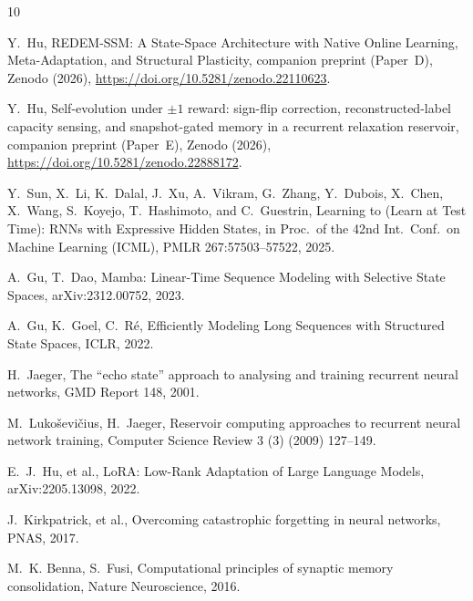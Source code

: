 \documentclass[preprint,12pt]{elsarticle}
\begin{document}
\begin{thebibliography}{10}

Y.~Hu,
REDEM-SSM: A State-Space Architecture with Native Online Learning,
Meta-Adaptation, and Structural Plasticity,
companion preprint (Paper~D), Zenodo (2026),
\url{https://doi.org/10.5281/zenodo.22110623}.

Y.~Hu,
Self-evolution under $\pm1$ reward: sign-flip correction,
reconstructed-label capacity sensing, and snapshot-gated memory in a
recurrent relaxation reservoir,
companion preprint (Paper~E), Zenodo (2026),
\url{https://doi.org/10.5281/zenodo.22888172}.

Y.~Sun, X.~Li, K.~Dalal, J.~Xu, A.~Vikram, G.~Zhang, Y.~Dubois,
X.~Chen, X.~Wang, S.~Koyejo, T.~Hashimoto, and C.~Guestrin,
Learning to (Learn at Test Time): RNNs with Expressive Hidden States,
in Proc.\ of the 42nd Int.\ Conf.\ on Machine Learning (ICML),
PMLR 267:57503--57522, 2025.

A.~Gu, T.~Dao,
Mamba: Linear-Time Sequence Modeling with Selective State Spaces,
arXiv:2312.00752, 2023.

A.~Gu, K.~Goel, C.~R\'e,
Efficiently Modeling Long Sequences with Structured State Spaces,
ICLR, 2022.

H.~Jaeger,
The ``echo state'' approach to analysing and training recurrent neural
networks,
GMD Report 148, 2001.

M.~Luko\v{s}evi\v{c}ius, H.~Jaeger,
Reservoir computing approaches to recurrent neural network training,
Computer Science Review 3 (3) (2009) 127--149.

E.~J.~Hu, et al.,
LoRA: Low-Rank Adaptation of Large Language Models,
arXiv:2205.13098, 2022.

J.~Kirkpatrick, et al.,
Overcoming catastrophic forgetting in neural networks,
PNAS, 2017.

M.~K. Benna, S.~Fusi,
Computational principles of synaptic memory consolidation,
Nature Neuroscience, 2016.

\end{thebibliography}
\end{document}
